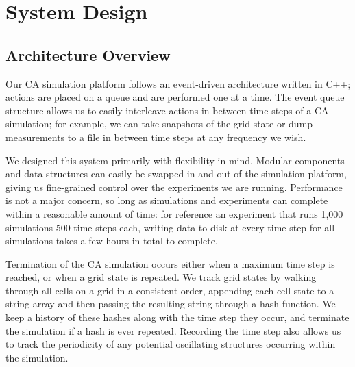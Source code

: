 \documentclass[a4paper,11pt]{article}
\begin{document}




\section{System Design}
\label{sec:System}

\subsection{Architecture Overview}
Our CA simulation platform follows an event-driven architecture written in C++; actions are placed on a queue and are performed one at a time. The event queue structure allows us to easily interleave actions in between time steps of a CA simulation; for example, we can take snapshots of the grid state or dump measurements to a file in between time steps at any frequency we wish.

We designed this system primarily with flexibility in mind. Modular components and data structures can easily be swapped in and out of the simulation platform, giving us fine-grained control over the experiments we are running. Performance is not a major concern, so long as simulations and experiments can complete within a reasonable amount of time: for reference an experiment that runs 1,000 simulations 500 time steps each, writing data to disk at every time step for all simulations takes a few hours in total to complete.


Termination of the CA simulation occurs either when a maximum time step is reached, or when a grid state is repeated. We track grid states by walking through all cells on a grid in a consistent order, appending each cell state to a string array and then passing the resulting string through a hash function. We keep a history of these hashes along with the time step they occur, and terminate the simulation if a hash is ever repeated. Recording the time step also allows us to track the periodicity of any potential oscillating structures occurring within the simulation.
\end{document}
